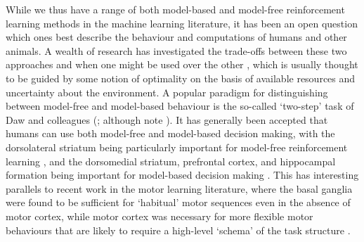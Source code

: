 While we thus have a range of both model-based and model-free reinforcement learning methods in the machine learning literature, it has been an open question which ones best describe the behaviour and computations of humans and other animals.
A wealth of research has investigated the trade-offs between these two approaches and when one might be used over the other \citep{daw2005uncertainty, geerts2020general, lengyel2007hippocampal}, which is usually thought to be guided by some notion of optimality on the basis of available resources and uncertainty about the environment.
A popular paradigm for distinguishing between model-free and model-based behaviour is the so-called `two-step' task of Daw and colleagues (\citealp{daw2011model,momennejad2017successor,wang2018prefrontal}; although note \citealp{akam2015simple}).
It has generally been accepted that humans can use both model-free and model-based decision making, with the dorsolateral striatum being particularly important for model-free reinforcement learning \citep{yin2004lesions, yin2005role}, and the dorsomedial striatum, prefrontal cortex, and hippocampal formation being important for model-based decision making \citep{vikbladh2019hippocampal,geerts2020general,miller2017dorsal,niv2009reinforcement,killcross2003coordination}.
This has interesting parallels to recent work in the motor learning literature, where the basal ganglia were found to be sufficient for `habitual' motor sequences even in the absence of motor cortex, while motor cortex was necessary for more flexible motor behaviours that are likely to require a high-level `schema' of the task structure \citep{mizes2023motor,mizes2023dissociating}.



